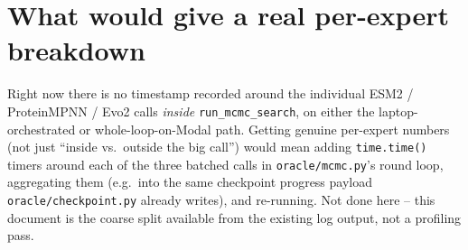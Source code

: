 \documentclass[11pt]{article}
\begin{document}
\section{What would give a real per-expert breakdown}
\label{sec:next}

Right now there is no timestamp recorded around the individual ESM2 /
ProteinMPNN / Evo2 calls \emph{inside} \texttt{run\_mcmc\_search}, on either
the laptop-orchestrated or whole-loop-on-Modal path. Getting genuine
per-expert numbers (not just ``inside vs.\ outside the big call'') would mean
adding \texttt{time.time()} timers around each of the three batched calls in
\texttt{oracle/mcmc.py}'s round loop, aggregating them (e.g.\ into the same
checkpoint progress payload \texttt{oracle/checkpoint.py} already writes),
and re-running. Not done here -- this document is the coarse split available
from the existing log output, not a profiling pass.
\end{document}
